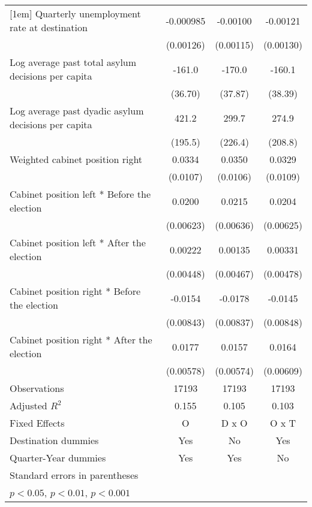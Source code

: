 \begin{table}[htbp]
\begin{tabular}{l*{3}{c}}
[1em]
Quarterly unemployment rate at destination&   -0.000985         &    -0.00100         &    -0.00121         \\
                    &   (0.00126)         &   (0.00115)         &   (0.00130)         \\
[1em]
Log average past total asylum decisions per capita&      -161.0\sym{***}&      -170.0\sym{***}&      -160.1\sym{***}\\
                    &     (36.70)         &     (37.87)         &     (38.39)         \\
[1em]
Log average past dyadic asylum decisions per capita&       421.2\sym{*}  &       299.7         &       274.9         \\
                    &     (195.5)         &     (226.4)         &     (208.8)         \\
[1em]
Weighted cabinet position right&      0.0334\sym{**} &      0.0350\sym{**} &      0.0329\sym{**} \\
                    &    (0.0107)         &    (0.0106)         &    (0.0109)         \\
[1em]
Cabinet position left * Before the election&      0.0200\sym{**} &      0.0215\sym{**} &      0.0204\sym{**} \\
                    &   (0.00623)         &   (0.00636)         &   (0.00625)         \\
[1em]
Cabinet position left * After the election&     0.00222         &     0.00135         &     0.00331         \\
                    &   (0.00448)         &   (0.00467)         &   (0.00478)         \\
[1em]
Cabinet position right * Before the election&     -0.0154         &     -0.0178\sym{*}  &     -0.0145         \\
                    &   (0.00843)         &   (0.00837)         &   (0.00848)         \\
[1em]
Cabinet position right * After the election&      0.0177\sym{**} &      0.0157\sym{**} &      0.0164\sym{**} \\
                    &   (0.00578)         &   (0.00574)         &   (0.00609)         \\
\hline
Observations        &       17193         &       17193         &       17193         \\
Adjusted \(R^{2}\)  &       0.155         &       0.105         &       0.103         \\
Fixed Effects       &           O         &       D x O         &       O x T         \\
Destination dummies &         Yes         &          No         &         Yes         \\
Quarter-Year dummies&         Yes         &         Yes         &          No         \\
\hline\hline
\multicolumn{4}{l}{\footnotesize Standard errors in parentheses}\\
\multicolumn{4}{l}{\footnotesize \sym{*} \(p<0.05\), \sym{**} \(p<0.01\), \sym{***} \(p<0.001\)}\\
\end{tabular}
\end{table}
